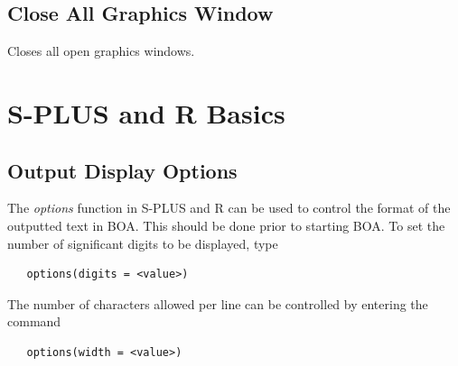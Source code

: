 \documentclass[12pt,letterpaper]{report}
\begin{document}
\section{Close All Graphics Window}
\noindent
Closes all open graphics windows.

\chapter{S-PLUS and R Basics}
\noindent

\section{Output Display Options}
\noindent
The {\it options} function in S-PLUS and R can be used to control the format of
the outputted text in BOA. This should be done prior to starting BOA. To set the
number of significant digits to be displayed, type
\vskip 9pt
\begin{tiny}
\begin{verbatim}
   options(digits = <value>)
\end{verbatim}
\end{tiny}
The number of characters allowed per line can be controlled by entering the
command
\vskip 9pt
\begin{tiny}
\begin{verbatim}
   options(width = <value>)
\end{verbatim}
\end{tiny}
\end{document}
